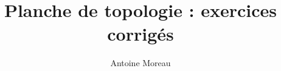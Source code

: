 \documentclass[a4paper,10pt]{article}
\title{Planche de topologie : exercices corrig\'es}
\author{Antoine Moreau}
\begin{document}
\maketitle

\begin{abstract}

\end{abstract}



\end{document}
